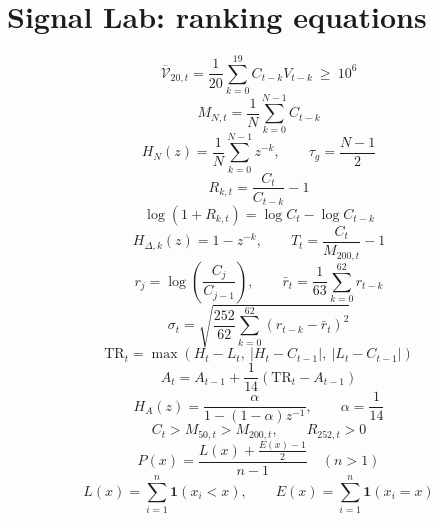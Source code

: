 \documentclass{article}
\begin{document}
\section*{Signal Lab: ranking equations}
\begin{equation}
\overline{\mathcal{V}}_{20,t}=\frac{1}{20}\sum_{k=0}^{19} C_{t-k}V_{t-k}\ \geq\ 10^6
\end{equation}
\begin{equation}
M_{N,t}=\frac{1}{N}\sum_{k=0}^{N-1}C_{t-k}
\end{equation}
\begin{equation}
H_N(z)=\frac{1}{N}\sum_{k=0}^{N-1}z^{-k},\qquad \tau_g=\frac{N-1}{2}
\end{equation}
\begin{equation}
R_{k,t}=\frac{C_t}{C_{t-k}}-1
\end{equation}
\begin{equation}
\log(1+R_{k,t})=\log C_t-\log C_{t-k}
\end{equation}
\begin{equation}
H_{\Delta,k}(z)=1-z^{-k},\qquad T_t=\frac{C_t}{M_{200,t}}-1
\end{equation}
\begin{equation}
r_j=\log\!\left(\frac{C_j}{C_{j-1}}\right),\qquad \bar r_t=\frac{1}{63}\sum_{k=0}^{62}r_{t-k}
\end{equation}
\begin{equation}
\sigma_t=\sqrt{\frac{252}{62}\sum_{k=0}^{62}(r_{t-k}-\bar r_t)^2}
\end{equation}
\begin{equation}
\mathrm{TR}_t=\max\!\left(H_t-L_t,\ |H_t-C_{t-1}|,\ |L_t-C_{t-1}|\right)
\end{equation}
\begin{equation}
A_t=A_{t-1}+\frac{1}{14}(\mathrm{TR}_t-A_{t-1})
\end{equation}
\begin{equation}
H_A(z)=\frac{\alpha}{1-(1-\alpha)z^{-1}},\qquad \alpha=\frac{1}{14}
\end{equation}
\begin{equation}
C_t>M_{50,t}>M_{200,t},\qquad R_{252,t}>0
\end{equation}
\begin{equation}
P(x)=\frac{L(x)+\frac{E(x)-1}{2}}{n-1}\quad (n>1)
\end{equation}
\begin{equation}
L(x)=\sum_{i=1}^{n}\mathbf{1}(x_i<x),\qquad E(x)=\sum_{i=1}^{n}\mathbf{1}(x_i=x)
\end{equation}
\end{document}
